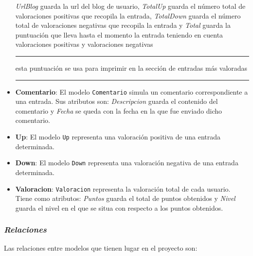 \documentclass[a4paper, 12pt]{book}
\begin{document}
\begin{itemize}
  \textit{UrlBlog} guarda la url del blog de usuario, \textit{TotalUp} guarda el n\'umero total de valoraciones positivas que recopila la entrada, 
  \textit{TotalDown} guarda el n\'umero total de valoraciones negativas que recopila la entrada y \textit{Total} guarda la puntuaci\'on que lleva hasta el
  momento la entrada teniendo en cuenta valoraciones positivas y valoraciones negativas \rule[1mm]{4mm}{0.1mm}esta puntuaci\'on se usa para imprimir en 
  la secci\'on de entradas m\'as valoradas\rule[1mm]{4mm}{0.1mm}
  \item {\bfseries Comentario}: El modelo \texttt{Comentario} simula un comentario correspondiente a una entrada. Sus atributos son: \textit{Descripcion}
  guarda el contenido del comentario y \textit{Fecha} se queda con la fecha en la que fue enviado dicho comentario.
  \item {\bfseries Up}: El modelo \texttt{Up} representa una valoraci\'on positiva de una entrada determinada.
  \item {\bfseries Down}: El modelo \texttt{Down} representa una valoraci\'on negativa de una entrada determinada.
  \item {\bfseries Valoracion}: \texttt{Valoracion} representa la valoraci\'on total de cada usuario. Tiene como atributos: \textit{Puntos} guarda el total
  de puntos obtenidos y \textit{Nivel} guarda el nivel en el que se situa con respecto a los puntos obtenidos.
\end{itemize}

\subsubsection{\textit{Relaciones}} 
\label{sec:relaciones}
Las relaciones entre modelos que tienen lugar en el proyecto son:
\end{document}
